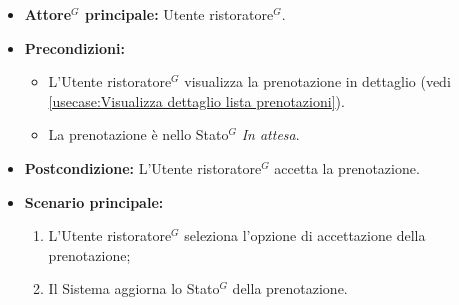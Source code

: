 \label{usecase:Accetta prenotazione}
\begin{itemize}
	\item \textbf{\gls{Attore}$^G$ principale:} \gls{Utente ristoratore}$^G$.

	\item \textbf{Precondizioni:}
	      \begin{itemize}
		      \item L'\gls{Utente ristoratore}$^G$ visualizza la prenotazione in dettaglio (vedi \autoref{usecase:Visualizza dettaglio lista prenotazioni}).

		      \item La prenotazione è nello \gls{Stato}$^G$ \textit{In attesa}.
	      \end{itemize}

	\item \textbf{Postcondizione:} L'\gls{Utente ristoratore}$^G$ accetta la prenotazione.


	\item \textbf{Scenario principale:}
	      \begin{enumerate}
		      \item L'\gls{Utente ristoratore}$^G$ seleziona l'opzione di accettazione della prenotazione;

		      \item Il Sistema aggiorna lo \gls{Stato}$^G$ della prenotazione.
	      \end{enumerate}
\end{itemize}
